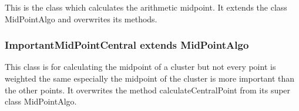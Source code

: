 	This is the class which calculates the arithmetic midpoint. It extends the class MidPointAlgo and overwrites its methods.	
	
	
	
	
	
	
	\subsubsection{ImportantMidPointCentral extends MidPointAlgo}
	
	This class is for calculating the midpoint of a cluster but not every point is weighted the same especially the midpoint of the cluster is more important than the other points. It overwrites the method calculateCentralPoint from its super class MidPointAlgo. 	
	
	\newpage
